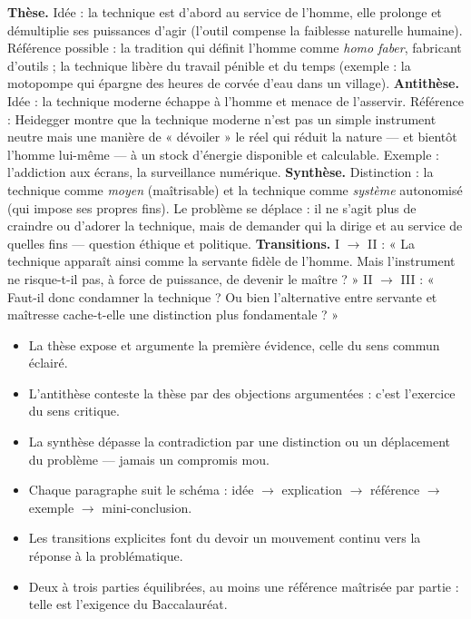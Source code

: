 \documentclass[11pt]{article}
\newcommand{\cle}[1]{{\popxbold\color{popdark}#1}}
\begin{document}
\begin{corrige}[Exercice]
\textbf{Thèse.} Idée : la technique est d'abord au service de l'homme, elle prolonge et démultiplie ses puissances d'agir (l'outil compense la faiblesse naturelle humaine). Référence possible : la tradition qui définit l'homme comme \emph{homo faber}, fabricant d'outils ; la technique libère du travail pénible et du temps (exemple : la motopompe qui épargne des heures de corvée d'eau dans un village).
\textbf{Antithèse.} Idée : la technique moderne échappe à l'homme et menace de l'asservir. Référence : Heidegger montre que la technique moderne n'est pas un simple instrument neutre mais une manière de « dévoiler » le réel qui réduit la nature — et bientôt l'homme lui-même — à un stock d'énergie disponible et calculable. Exemple : l'addiction aux écrans, la surveillance numérique.
\textbf{Synthèse.} Distinction : la technique comme \emph{moyen} (maîtrisable) et la technique comme \emph{système} autonomisé (qui impose ses propres fins). Le problème se déplace : il ne s'agit plus de craindre ou d'adorer la technique, mais de demander qui la dirige et au service de quelles fins — question éthique et politique.
\textbf{Transitions.} I $\rightarrow$ II : « La technique apparaît ainsi comme la servante fidèle de l'homme. Mais l'instrument ne risque-t-il pas, à force de puissance, de devenir le maître ? » II $\rightarrow$ III : « Faut-il donc condamner la technique ? Ou bien l'alternative entre servante et maîtresse cache-t-elle une distinction plus fondamentale ? »
\end{corrige}

\begin{aretenir}
\begin{itemize}
\item La \cle{thèse} expose et argumente la première évidence, celle du sens commun éclairé.
\item L'\cle{antithèse} conteste la thèse par des objections argumentées : c'est l'exercice du sens critique.
\item La \cle{synthèse} dépasse la contradiction par une distinction ou un déplacement du problème — jamais un compromis mou.
\item Chaque paragraphe suit le schéma : idée $\rightarrow$ explication $\rightarrow$ référence $\rightarrow$ exemple $\rightarrow$ mini-conclusion.
\item Les transitions explicites font du devoir un mouvement continu vers la réponse à la problématique.
\item Deux à trois parties équilibrées, au moins une référence maîtrisée par partie : telle est l'exigence du Baccalauréat.
\end{itemize}
\end{aretenir}
\end{document}
